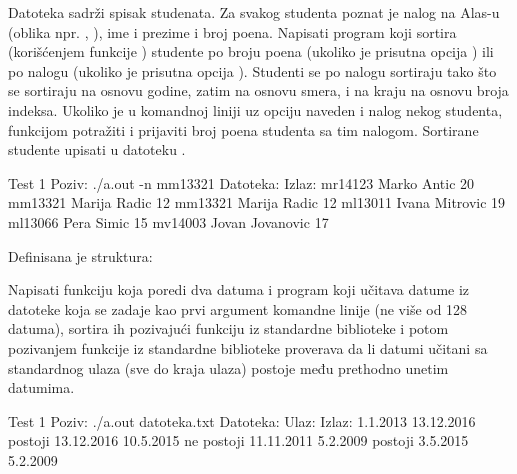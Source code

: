 \begin{Exercise}[label=523]
  Datoteka  sadrži spisak studenata. Za svakog
  studenta poznat je nalog na Alas-u (oblika npr. ,
  ), ime i prezime i broj poena. Napisati program koji
  sortira (korišćenjem funkcije ) studente po broju poena
  (ukoliko je prisutna opcija ) ili po nalogu (ukoliko je
  prisutna opcija ). Studenti se po nalogu sortiraju tako što
  se sortiraju na osnovu godine, zatim na osnovu smera, i na kraju na
  osnovu broja indeksa. Ukoliko je u komandnoj liniji uz opciju
   naveden i nalog nekog studenta, funkcijom 
  potražiti i prijaviti broj poena studenta sa tim nalogom. Sortirane
  studente upisati u datoteku .
  
\begin{maxitest}
\begin{test}{Test 1}
Poziv: ./a.out -n mm13321
Datoteka:                         Izlaz:
mr14123 Marko Antic 20            mm13321 Marija Radic 12
mm13321 Marija Radic 12
ml13011 Ivana Mitrovic 19
ml13066 Pera Simic 15
mv14003 Jovan Jovanovic 17
\end{test}
\end{maxitest}
  
\end{Exercise}

\begin{Exercise}[label=524]
  Definisana je struktura:
  \begin{ckod}
    typedef struct { int dan; int mesec; int godina; } Datum;}
  \end{ckod}
  Napisati funkciju koja poredi dva datuma i program koji učitava
  datume iz datoteke koja se zadaje kao prvi argument komandne linije
  (ne više od 128 datuma), sortira ih pozivajući funkciju
   iz standardne biblioteke i potom pozivanjem funkcije
   iz standardne biblioteke proverava da li datumi
  učitani sa standardnog ulaza (sve do kraja ulaza) postoje među
  prethodno unetim datumima.
  
\begin{maxitest}
\begin{test}{Test 1}
Poziv: ./a.out datoteka.txt
Datoteka:            Ulaz:             Izlaz:
1.1.2013             13.12.2016        postoji
13.12.2016           10.5.2015         ne postoji
11.11.2011           5.2.2009          postoji
3.5.2015
5.2.2009
\end{test}
\end{maxitest}
  
\end{Exercise}

